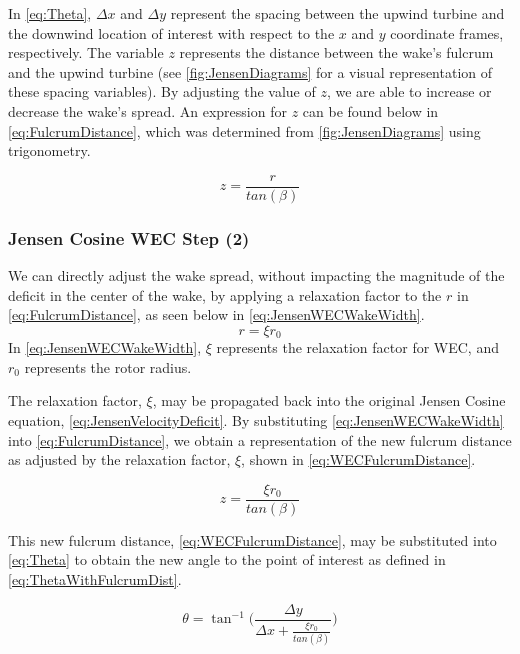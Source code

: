 \documentclass[a4paper]{jpconf}
\begin{document}
In \cref{eq:Theta}, $\Delta x$ and $\Delta y$ represent the spacing between the upwind turbine and the downwind location of interest with respect to the $x$ and $y$ coordinate frames, respectively. The variable $z$ represents the distance between the wake's fulcrum and the upwind turbine (see \cref{fig:JensenDiagrams} for a visual representation of these spacing variables). By adjusting the value of $z$, we are able to increase or decrease the wake's spread. An expression for $z$ can be found below in \cref{eq:FulcrumDistance}, which was determined from \cref{fig:JensenDiagrams} using trigonometry.

\begin{equation}
z = \frac{r}{tan(\beta)}
\label{eq:FulcrumDistance}
\end{equation} 

\subsubsection{Jensen Cosine WEC Step (2)}
We can directly adjust the wake spread, without impacting the magnitude of the deficit in the center of the wake, by applying a relaxation factor to the $r$ in \cref{eq:FulcrumDistance}, as seen below in \cref{eq:JensenWECWakeWidth}.
%
\begin{equation}
r = \xi r_0
\label{eq:JensenWECWakeWidth}
\end{equation}
%
In \cref{eq:JensenWECWakeWidth}, $\xi$ represents the relaxation factor for WEC, and $r_0$ represents the rotor radius.

The relaxation factor, $\xi$, may be propagated back into the original Jensen Cosine equation, \cref{eq:JensenVelocityDeficit}. By substituting \cref{eq:JensenWECWakeWidth} into \cref{eq:FulcrumDistance}, we obtain a representation of the new fulcrum distance as adjusted by the relaxation factor, $\xi$, shown in \cref{eq:WECFulcrumDistance}.

\begin{equation}
z = \frac{\xi r_0}{tan(\beta)}
\label{eq:WECFulcrumDistance}
\end{equation}

This new fulcrum distance, \cref{eq:WECFulcrumDistance}, may be substituted into \cref{eq:Theta} to obtain the new angle to the point of  interest as defined in \cref{eq:ThetaWithFulcrumDist}.

\begin{equation}
\theta = \tan^{-1}\Bigg( \frac{\Delta y}{\Delta x + \frac{\xi r_0}{tan(\beta)}} \Bigg)
\label{eq:ThetaWithFulcrumDist}
\end{equation}
\end{document}
